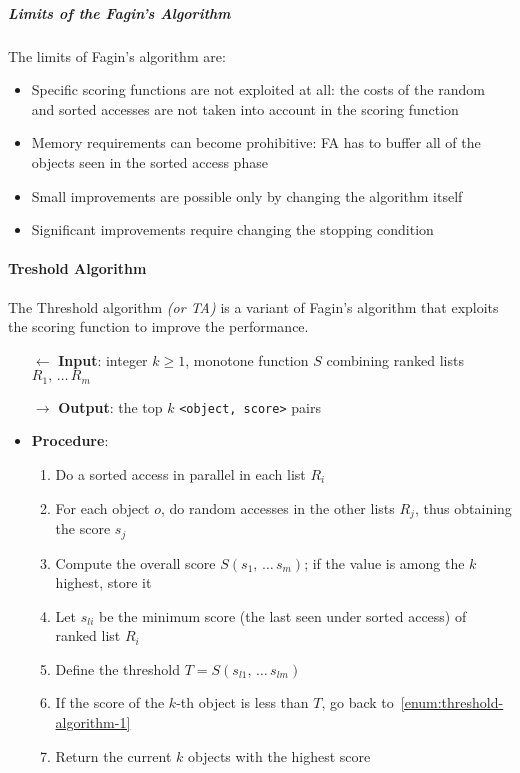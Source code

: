 \documentclass[english]{article}
\begin{document}
\subparagraph*{Limits of the Fagin's Algorithm}
The limits of Fagin's algorithm are:

\begin{itemize}
  \item Specific scoring functions are not exploited at all: the costs of the random and sorted accesses are not taken into account in the scoring function
  \item Memory requirements can become prohibitive: FA has to buffer all of the objects seen in the sorted access phase
  \item Small improvements are possible only by changing the algorithm itself
  \item Significant improvements require changing the stopping condition
\end{itemize}

\paragraph{Treshold Algorithm}

The Threshold algorithm \textit{(or TA)} is a variant of Fagin's algorithm that exploits the scoring function to improve the performance.

\begin{itemize}
  \item[\(\leftarrow\)] \textbf{Input}: integer \(k \geq 1\), monotone function \(S\) combining ranked lists \(R_1, \,\ldots\, R_m\)
  \item[\(\rightarrow\)] \textbf{Output}: the top \(k\) \texttt{<object, score>} pairs
  \item \textbf{Procedure}:
        \begin{enumerate}[label=step \arabic*., ref=step (\arabic*), widest*=7, leftmargin=*, labelindent=1em]
          \item\label{enum:threshold-algorithm-1} Do a sorted access in parallel in each list \(R_i\)
          \item For each object \(o\), do random accesses in the other lists \(R_j\), thus obtaining the score \(s_j\)
          \item Compute the overall score \(S\left( s_1, \,\ldots\, s_m \right)\); if the value is among the \(k\) highest, store it
          \item Let \(s_{li}\) be the minimum score (the last seen under sorted access) of ranked list \(R_i\)
          \item Define the threshold \(T = S\left( s_{l1}, \,\ldots\, s_{lm} \right)\)
          \item If the score of the \(k\)-th object is less than \(T\), go back to~\ref{enum:threshold-algorithm-1}
          \item Return the current \(k\) objects with the highest score
        \end{enumerate}
\end{itemize}
\end{document}
